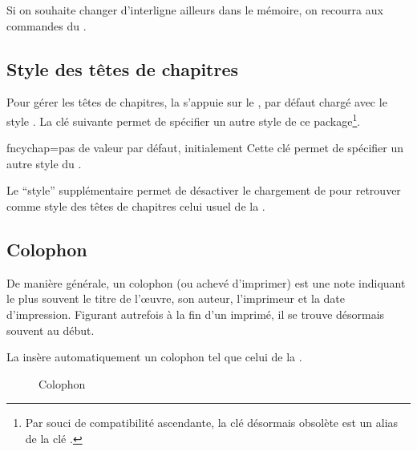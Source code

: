 Si on souhaite changer d'interligne ailleurs dans le mémoire, on recourra aux
commandes du  .

\subsection{Style des têtes de chapitres}\label{sec-style-des-tetes}

Pour gérer les têtes de chapitres, la \yatCl{} s'appuie sur le
, par défaut chargé avec le style . La
clé  suivante permet de spécifier un autre style de ce
package\footnote{Par souci de compatibilité ascendante, la clé désormais
  obsolète  est un alias de la clé
  .}.%
%
{%
  \begin{docKey}{fncychap}{=\textbar{}\textbar{}\textbar{}\textbar{}\textbar{}\textbar{}\textbar{}\textbar{}}{pas
      de valeur par défaut, initialement }
    Cette clé permet de spécifier un autre style du .

    Le \enquote{style} supplémentaire  permet de désactiver le
    chargement de  pour retrouver comme style des têtes de
    chapitres celui usuel de la .
  \end{docKey}
}

\subsection{Colophon}
\label{sec-coloplhon}
%
%

De manière générale, un colophon (ou achevé d'imprimer) est une note indiquant
le plus souvent le titre de l'œuvre, son auteur, l'imprimeur et la date
d'impression. Figurant autrefois à la fin d'un imprimé, il se trouve désormais
souvent au début.

%
%
La \yatCl{} insère automatiquement un colophon tel que celui de la
.
\begin{figure}[htbp]
  \centering
  \caption{Colophon}
  \label{fig-colophon}
\end{figure}

